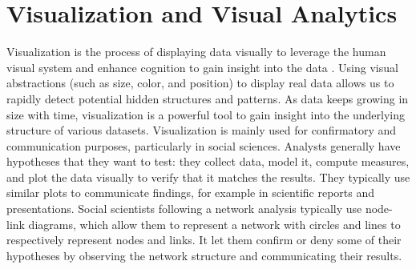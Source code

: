 %


\section{Visualization and Visual Analytics}

Visualization is the process of displaying data visually to leverage the human visual system and enhance cognition to gain insight into the data \cite{cardReadingsInformationVisualization1999}.
Using visual abstractions (such as size, color, and position) to display real data allows us to rapidly detect potential hidden structures and patterns.
As data keeps growing in size with time, visualization is a powerful tool to gain insight into the underlying structure of various datasets.
Visualization is mainly used for confirmatory and communication purposes, particularly in social sciences.
Analysts generally have hypotheses that they want to test: they collect data, model it, compute measures, and plot the data visually to verify that it matches the results.
They typically use similar plots to communicate findings, for example in scientific reports and presentations.
Social scientists following a network analysis typically use node-link diagrams, which allow them to represent a network with circles and lines to respectively represent nodes and links.
It let them confirm or deny some of their hypotheses by observing the network structure and communicating their results.

